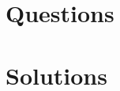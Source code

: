 \documentclass[a4paper,12pt]{book}
\begin{document}
\tableofcontents

\part{Questions}





\part{Solutions}



\end{document}
